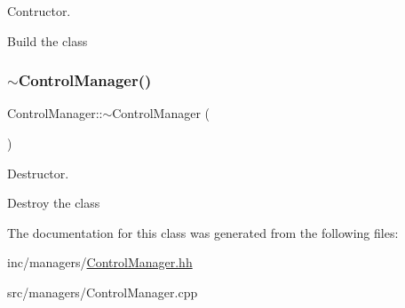 Contructor. 

Build the class \mbox{\label{classControlManager_a58c547d9cb07dfaa0d6967cc656b80cb}} 
\subsubsection{\texorpdfstring{$\sim$\+Control\+Manager()}{~ControlManager()}}
{\footnotesize\ttfamily Control\+Manager\+::$\sim$\+Control\+Manager (\begin{DoxyParamCaption}{ }\end{DoxyParamCaption})}



Destructor. 

Destroy the class 

The documentation for this class was generated from the following files\+:\begin{DoxyCompactItemize}
\item 
inc/managers/\hyperlink{ControlManager_8hh}{Control\+Manager.\+hh}\item 
src/managers/Control\+Manager.\+cpp\end{DoxyCompactItemize}
